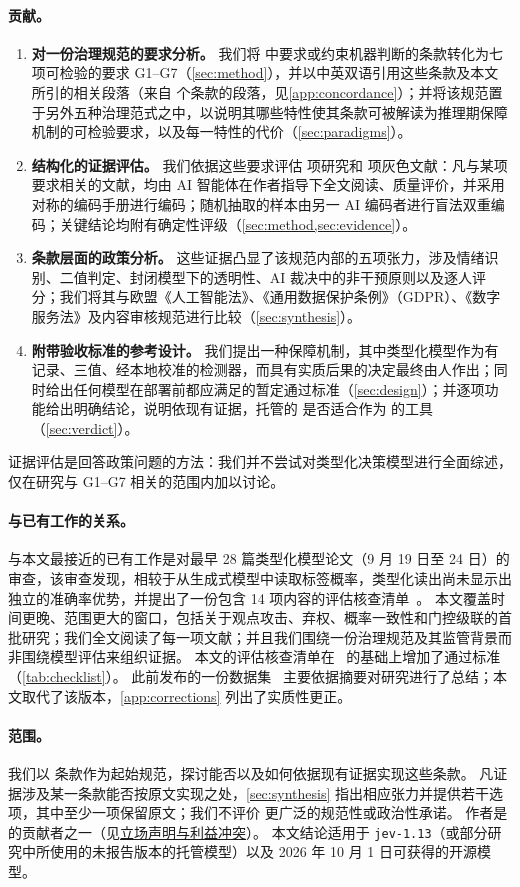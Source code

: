 \paragraph{贡献。}
\begin{enumerate}
  \item \textbf{对一份治理规范的要求分析。} 我们将 \pol{} 中要求或约束机器判断的条款转化为七项可检验的要求 G1--G7（\cref{sec:method}），并以中英双语引用这些条款及本文所引的相关段落（来自 \nPolClauses{} 个条款的段落，见\cref{app:concordance}）；并将该规范置于另外五种治理范式之中，以说明其哪些特性使其条款可被解读为推理期保障机制的可检验要求，以及每一特性的代价（\cref{sec:paradigms}）。
  \item \textbf{结构化的证据评估。} 我们依据这些要求评估 \nPapers{} 项研究和 \nGrey{} 项灰色文献：凡与某项要求相关的文献，均由 AI 智能体在作者指导下全文阅读、质量评价，并采用对称的编码手册进行编码；随机抽取的样本由另一 AI 编码者进行盲法双重编码；关键结论均附有确定性评级（\cref{sec:method,sec:evidence}）。
  \item \textbf{条款层面的政策分析。} 这些证据凸显了该规范内部的五项张力，涉及情绪识别、二值判定、封闭模型下的透明性、AI 裁决中的非干预原则以及逐人评分；我们将其与欧盟《人工智能法》、《通用数据保护条例》（GDPR）、《数字服务法》及内容审核规范进行比较（\cref{sec:synthesis}）。
  \item \textbf{附带验收标准的参考设计。} 我们提出一种保障机制，其中类型化模型作为有记录、三值、经本地校准的检测器，而具有实质后果的决定最终由人作出；同时给出任何模型在部署前都应满足的暂定通过标准（\cref{sec:design}）；并逐项功能给出明确结论，说明依现有证据，托管的 \jev{} 是否适合作为 \pol{} 的工具（\cref{sec:verdict}）。
\end{enumerate}
证据评估是回答政策问题的方法：我们并不尝试对类型化决策模型进行全面综述，仅在研究与 G1--G7 相关的范围内加以讨论。

\paragraph{与已有工作的关系。}
与本文最接近的已有工作是对最早 28 篇类型化模型论文（9 月 19 日至 24 日）的审查，该审查发现，相较于从生成式模型中读取标签概率，类型化读出尚未显示出独立的准确率优势，并提出了一份包含 14 项内容的评估核查清单~\cite{arx32160}。
本文覆盖时间更晚、范围更大的窗口，包括关于观点攻击、弃权、概率一致性和门控级联的首批研究；我们全文阅读了每一项文献；并且我们围绕一份治理规范及其监管背景而非围绕模型评估来组织证据。
本文的评估核查清单在~\cite{arx32160} 的基础上增加了通过标准（\cref{tab:checklist}）。
此前发布的一份数据集~\cite{survey01} 主要依据摘要对研究进行了总结；本文取代了该版本，\cref{app:corrections} 列出了实质性更正。

\paragraph{范围。}
我们以 \pol{} 条款作为起始规范，探讨能否以及如何依据现有证据实现这些条款。
凡证据涉及某一条款能否按原文实现之处，\cref{sec:synthesis} 指出相应张力并提供若干选项，其中至少一项保留原文；我们不评价 \pol{} 更广泛的规范性或政治性承诺。
作者是 \pol{} 的贡献者之一（见\hyperref[sec:statements]{立场声明与利益冲突}）。
本文结论适用于 \texttt{jev-1.13}（或部分研究中所使用的未报告版本的托管模型）以及 2026 年 10 月 1 日可获得的开源模型。
